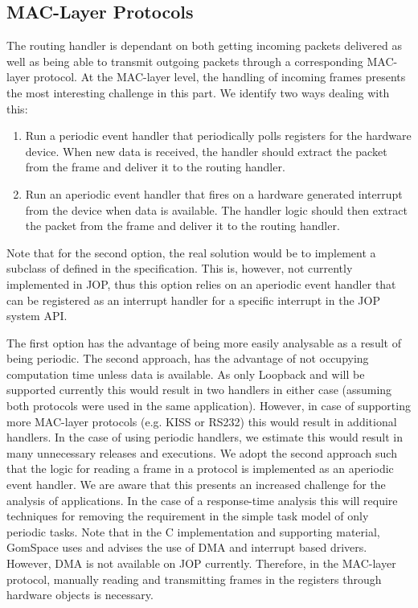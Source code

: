 \subsection{MAC-Layer Protocols}
The routing handler is dependant on both getting incoming packets delivered as well as being able to transmit outgoing packets through a corresponding MAC-layer protocol. At the MAC-layer level, the handling of incoming frames presents the most interesting challenge in this part. We identify two ways dealing with this:
\begin{enumerate}
	\item Run a periodic event handler that periodically polls registers for the hardware device. When new data is received, the handler should extract the packet from the frame and deliver it to the routing handler.
	\item Run an aperiodic event handler that fires on a hardware generated interrupt from the device when data is available. The handler logic should then extract the packet from the frame and deliver it to the routing handler.
\end{enumerate}

Note that for the second option, the real solution would be to implement a subclass of  defined in the specification. This is, however, not currently implemented in JOP, thus this option relies on an aperiodic event handler that can be registered as an interrupt handler for a specific interrupt in the JOP system API.


The first option has the advantage of being more easily analysable as a result of being periodic. The second approach, has the advantage of not occupying computation time unless data is available. As only Loopback and \iic will be supported currently this would result in two handlers in either case (assuming both protocols were used in the same application). However, in case of supporting more MAC-layer protocols (e.g. KISS or RS232) this would result in additional handlers. In the case of using periodic handlers, we estimate this would result in many unnecessary releases and executions. We adopt the second approach such that the logic for reading a frame in a protocol is implemented as an aperiodic event handler. We are aware that this presents an increased challenge for the analysis of applications. In the case of a response-time analysis this will require techniques for removing the requirement in the simple task model of only periodic tasks. Note that in the C implementation and supporting material, GomSpace uses and advises the use of DMA and interrupt based drivers. However, DMA is not available on JOP currently. Therefore, in the \iic MAC-layer protocol, manually reading and transmitting frames in the registers through hardware objects is necessary.
